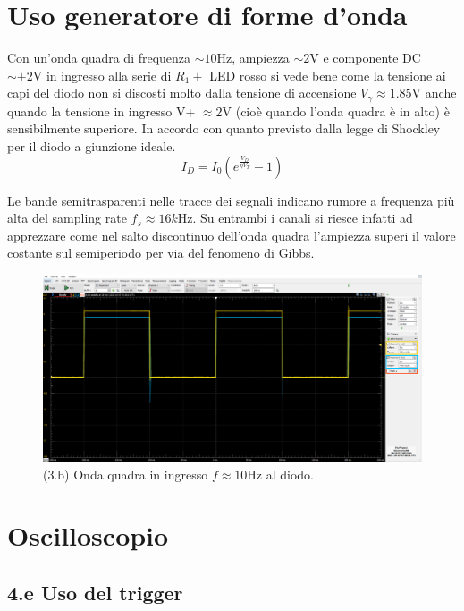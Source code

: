 \documentclass[10pt,a4paper]{article}
\begin{document}
\section{Uso generatore di forme d'onda}
Con un'onda quadra di frequenza $\sim 10 \si{\Hz}$, ampiezza $\sim 2 \si{\V}$
e componente DC $\sim + 2 \si{\V}$ in ingresso alla serie di $R_1 +$ LED
rosso si vede bene come la tensione ai capi del diodo non si discosti
molto dalla tensione di accensione $V_\gamma \approx 1.85 \si{\V}$ anche
quando la tensione in ingresso V+ $\approx 2 \si{\V}$ (cioè quando l'onda
quadra è in alto) è sensibilmente superiore. In accordo con quanto previsto
dalla legge di Shockley per il diodo a giunzione ideale.
\begin{equation}\label{eq:shockley}
I_D = I_0 \left(e^{\frac{V_D}{\eta V_T}} - 1 \right)
\end{equation}

Le bande semitrasparenti nelle tracce dei segnali indicano rumore a frequenza
più alta del sampling rate $f_s \approx 16 \si{k\Hz}$. Su entrambi i canali
si riesce infatti ad apprezzare come nel salto discontinuo dell'onda quadra
l'ampiezza superi il valore costante sul semiperiodo per via del fenomeno di
Gibbs. 

\begin{figure}[htb]
\centering
\includegraphics[scale=0.3]{sqwdiode}
\caption{(3.b) Onda quadra in ingresso $f \approx 10 \si{\Hz}$ al diodo.}
\end{figure}
\section{Oscilloscopio}

\subsection*{4.e Uso del trigger}
\end{document}
